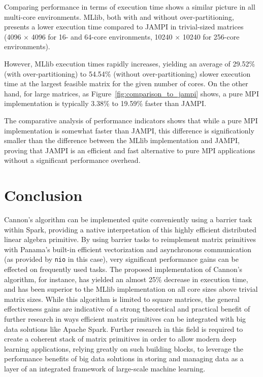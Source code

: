 \documentclass[fleqn,10pt]{SelfArx} %
\begin{document}

Comparing performance in terms of execution time shows a similar picture in all multi-core environments. MLlib, both with and without over-partitioning, presents a lower execution time compared to JAMPI in trivial-sized matrices (4096 $\times$ 4096 for 16- and 64-core environments, 10240 $\times$ 10240 for 256-core environments). 

However, MLlib execution times rapidly increases, yielding an average of 29.52\% (with over-partitioning) to 54.54\% (without over-partitioning) slower execution time at the largest feasible matrix for the given number of cores. On the other hand, for large matrices, as Figure~\ref{fig:comparison_to_jampi} shows, a pure MPI implementation is typically 3.38\% to 19.59\% faster than JAMPI. 

The comparative analysis of performance indicators shows that while a pure MPI implementation is somewhat faster than JAMPI, this difference is significationly smaller than the difference between the MLlib implementation and JAMPI, proving that JAMPI is an efficient and fast alternative to pure MPI applications without a significant performance overhead.





\section{Conclusion} %
\label{sec:conclusion}

Cannon's algorithm can be implemented quite conveniently using a barrier task within Spark, providing a native interpretation of this highly efficient distributed linear algebra primitive. By using barrier tasks to reimplement matrix primitives with Panama's built-in efficient vectorization and asynchronous communication (as provided by \texttt{nio} in this case), very significant performance gains can be effected on frequently used tasks. The proposed implementation of Cannon's algorithm, for instance, has yielded an almost 25\% decrease in execution time, and has been superior to the MLlib implementation on all core sizes above trivial matrix sizes. While this algorithm is limited to square matrices, the general effectiveness gains are indicative of a strong theoretical and practical benefit of further research in ways efficient matrix primitives can be integrated with big data solutions like Apache Spark. Further research in this field is required to create a coherent stack of matrix primitives in order to allow modern deep learning applications, relying greatly on such building blocks, to leverage the performance benefits of big data solutions in storing and managing data as a layer of an integrated framework of large-scale machine learning.
\end{document}
